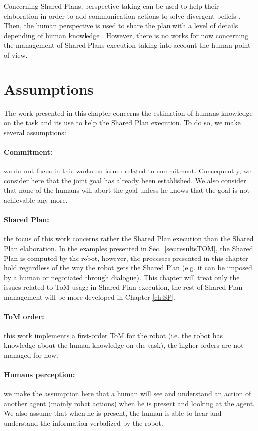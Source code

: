 \documentclass[english,a4paper,11pt,twoside]{StyleThese}
\begin{document}
Concerning Shared Plans, perspective taking can be used to help their elaboration in order to add communication actions to solve divergent beliefs \cite{guitton2012belief}. Then, the human perspective is used to share the plan with a level of details depending of human knowledge \cite{milliez2016using}. However, there is no works for now concerning the management of Shared Plans execution taking into account the human point of view. 

\section{Assumptions}


The work presented in this chapter concerns the estimation of humans knowledge on the task and its use to help the Shared Plan execution. To do so, we make several assumptions:

\paragraph{Commitment:} we do not focus in this works on issues related to commitment. Consequently, we consider here that the joint goal has already been established. We also consider that none of the humans will abort the goal unless he knows that the goal is not achievable any more.

\paragraph{Shared Plan:} the focus of this work concerns rather the Shared Plan execution than the Shared Plan elaboration. In the examples presented in Sec.~\ref{sec:resultsTOM}, the Shared Plan is computed by the robot, however, the processes presented in this chapter hold regardless of the way the robot gets the Shared Plan (e.g. it can be imposed by a human or negotiated through dialogue). This chapter will treat only the issues related to ToM usage in Shared Plan execution, the rest of Shared Plan management will be more developed in Chapter \ref{ch:SP}.

\paragraph{ToM order:} this work implements a first-order ToM for the robot (i.e. the robot has knowledge about the human knowledge on the task), the higher orders are not managed for now.

\paragraph{Humans perception:} we make the assumption here that a human will see and understand an action of another agent (mainly robot actions) when he is present and looking at the agent. We
also assume that when he is present, the human is able to hear and understand the information verbalized by the robot.
\end{document}
